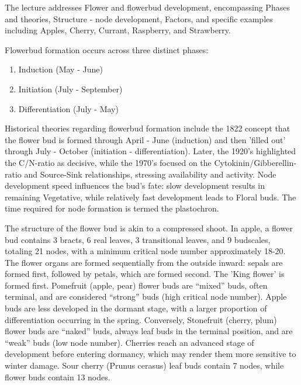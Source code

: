 \vspace{1em}
The lecture addresses Flower and flowerbud development, encompassing Phases and theories, Structure - node development, Factors, and specific examples including Apples, Cherry, Currant, Raspberry, and Strawberry. 

\vspace{0.5em}
Flowerbud formation occurs across three distinct phases: 

\begin{enumerate} 
    \item Induction (May - June) 
    \item Initiation (July - September) 
    \item Differentiation (July - May) 
\end{enumerate} 

\vspace{0.5em}
Historical theories regarding flowerbud formation include the 1822 concept that the flower bud is formed through April - June (induction) and then 'filled out' through July - October (initiation - differentiation). Later, the 1920's highlighted the C/N-ratio as decisive, while the 1970's focused on the Cytokinin/Gibberellin-ratio and Source-Sink relationships, stressing availability and activity. Node development speed influences the bud's fate: slow development results in remaining Vegetative, while relatively fast development leads to Floral buds. The time required for node formation is termed the plastochron.

\vspace{0.5em}
The structure of the flower bud is akin to a compressed shoot. In apple, a flower bud contains 3 bracts, 6 real leaves, 3 transitional leaves, and 9 budscales, totaling 21 nodes, with a minimum critical node number approximately 18-20. The flower organs are formed sequentially from the outside inward: sepals are formed first, followed by petals, which are formed second. The 'King flower' is formed first. Pomefruit (apple, pear) flower buds are “mixed” buds, often terminal, and are considered “strong” buds (high critical node number). Apple buds are less developed in the dormant stage, with a larger proportion of differentiation occurring in the spring. Conversely, Stonefruit (cherry, plum) flower buds are “naked” buds, always leaf buds in the terminal position, and are “weak” buds (low node number). Cherries reach an advanced stage of development before entering dormancy, which may render them more sensitive to winter damage. Sour cherry (Prunus cerasus) leaf buds contain 7 nodes, while flower buds contain 13 nodes.

